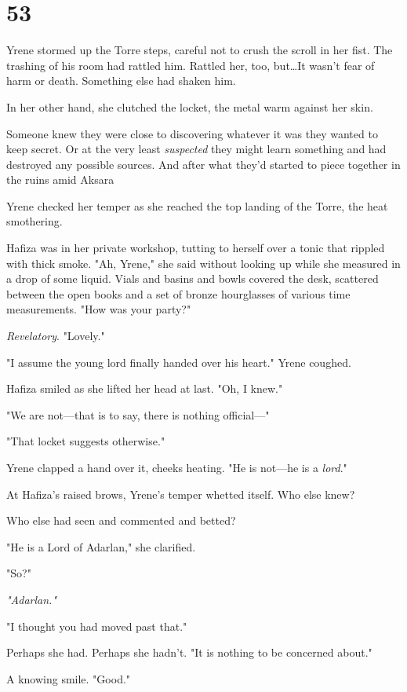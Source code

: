 
\chapter{53}

Yrene stormed up the Torre steps, careful not to crush the scroll in her fist.
The trashing of his room had rattled him.
Rattled her, too, but\ldots It wasn't fear of harm or death.
Something else had shaken him.

In her other hand, she clutched the locket, the metal warm against her skin.

Someone knew they were close to discovering whatever it was they wanted to keep secret.
Or at the very least \emph{suspected} they might learn something and had destroyed any possible sources.
And after what they'd started to piece together in the ruins amid Aksara 

Yrene checked her temper as she reached the top landing of the Torre, the heat smothering.

Hafiza was in her private workshop, tutting to herself over a tonic that rippled with thick smoke.
"Ah, Yrene," she said without looking up while she measured in a drop of some liquid.
Vials and basins and bowls covered the desk, scattered between the open books and a set of bronze hourglasses of various time measurements.
"How was your party?"

\emph{Revelatory}.
"Lovely."

"I assume the young lord finally handed over his heart."
Yrene coughed.

Hafiza smiled as she lifted her head at last.
"Oh, I knew."

"We are not---that is to say, there is nothing official---"

"That locket suggests otherwise."

Yrene clapped a hand over it, cheeks heating.
"He is not---he is a \emph{lord}."

At Hafiza's raised brows, Yrene's temper whetted itself.
Who else knew?

Who else had seen and commented and betted?

"He is a Lord of Adarlan," she clarified.

"So?"

\emph{"Adarlan."}

"I thought you had moved past that."

Perhaps she had.
Perhaps she hadn't.
"It is nothing to be concerned about."

A knowing smile.
"Good."

